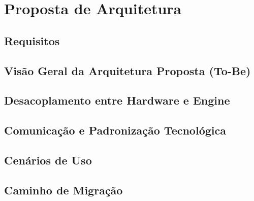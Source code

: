 \chapter{Proposta de Arquitetura}
\label{cap:proposta}

\section{Requisitos}

\section{Visão Geral da Arquitetura Proposta (To-Be)}

\section{Desacoplamento entre Hardware e Engine}

\section{Comunicação e Padronização Tecnológica}

\section{Cenários de Uso}

\section{Caminho de Migração}
